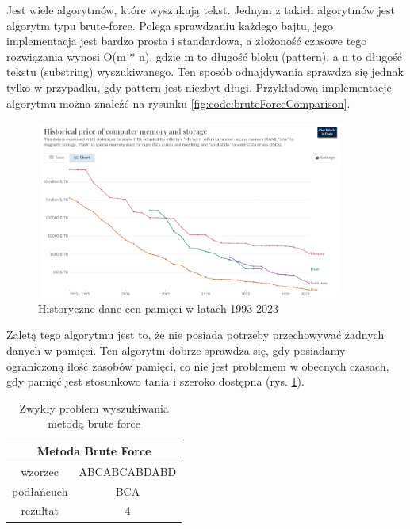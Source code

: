 Jest wiele algorytmów, które wyszukują tekst. Jednym z takich algorytmów jest 
algorytm typu brute-force. Polega sprawdzaniu każdego bajtu, jego implementacja
jest bardzo prosta i standardowa, a złożoność czasowe tego rozwiązania wynosi
O(m * n), gdzie m to długość bloku (pattern), a n to długość tekstu (substring) 
wyszukiwanego. Ten sposób odnajdywania sprawdza się jednak tylko w przypadku,
gdy pattern jest niezbyt długi. Przykładową implementacje algorytmu można 
znaleźć na rysunku \ref{fig:code:bruteForceComparison}.


\begin{figure}[h]
  \centering
  \includegraphics[width=0.9\textwidth]{./images/historical-mem-price.png}
  \caption{Historyczne dane cen pamięci w latach 1993-2023}
  \label{screenshot:MemPrices}
\end{figure}
Zaletą tego algorytmu jest to, że nie posiada potrzeby przechowywać żadnych 
danych w pamięci. Ten algorytm dobrze sprawdza się, gdy posiadamy ograniczoną 
ilość zasobów pamięci, co nie jest problemem w obecnych czasach, gdy pamięć jest
stosunkowo tania i szeroko dostępna (rys. \ref{screenshot:MemPrices}).

\begin{table}
  \centering
  \begin{tabular}{ |c|c|  } 
    \hline
    \multicolumn{2}{|c|}{Metoda Brute Force} \\
    \hline
    wzorzec & ABCABCABDABD \\
    \hline
    podłańcuch & BCA \\
    \hline
    rezultat & 4 \\
    \hline
  \end{tabular}
  \caption{Zwykły problem wyszukiwania metodą brute force}
  \label{tabela:NormalProblemBruteForce}
\end{table}

